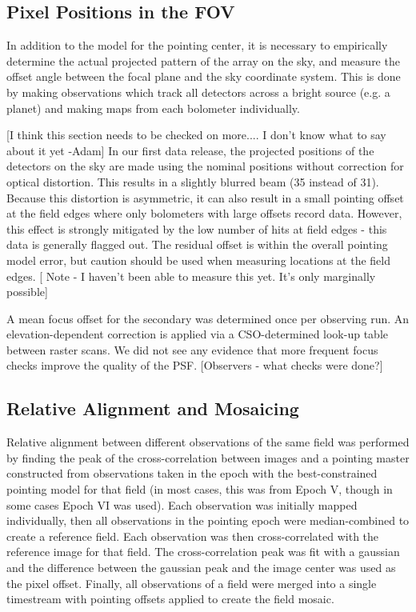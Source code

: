 \documentclass[12pt,preprint]{aastex}
\begin{document}
\subsection{Pixel Positions in the FOV}

In addition to the model for the pointing center, it is necessary to
empirically determine the actual projected pattern of the array on the
sky, and measure the offset angle between the focal plane and the sky
coordinate system.  This is done by making observations which track
all detectors across a bright source (e.g. a planet) and making maps from each
bolometer individually. 

[I think this section needs to be checked on more.... I don't know what to say about it yet -Adam]
In our first data release, the projected positions of the detectors on the sky
are made using the nominal positions without correction for optical distortion.
This results in a slightly blurred beam (35 instead of 31).
Because this distortion is asymmetric, it can also result in a small pointing
offset at the field edges where only bolometers with large offsets record data.
However, this effect is strongly mitigated by the low number of hits at field
edges - this data is generally flagged out.  The residual offset is within the
overall pointing model error, but caution should be used when measuring
locations at the field edges. [ Note - I haven't been able to measure this yet.  It's only marginally
possible]

A mean focus offset for the secondary was determined once per observing
run.  An elevation-dependent correction is applied via a
CSO-determined look-up table between raster scans.  We did not see any
evidence that more frequent focus checks improve the quality of the
PSF. [Observers - what checks were done?]

\subsection{Relative Alignment and Mosaicing}

Relative alignment between different observations of the same field was
performed by finding the peak of the cross-correlation between images and a
pointing master constructed  from observations taken in the epoch with the
best-constrained pointing model for that field (in most cases, this was from
Epoch V, though in some cases Epoch VI was used).  Each observation was
initially mapped individually, then all observations in the pointing epoch were
median-combined to create a reference field.  Each observation was then
cross-correlated with the reference image for that field. The cross-correlation
peak was fit with a gaussian and the difference between the gaussian peak and
the image center was used as the pixel offset.  Finally, all observations of a
field were merged into a single timestream with pointing offsets applied to
create the field mosaic.
\end{document}

